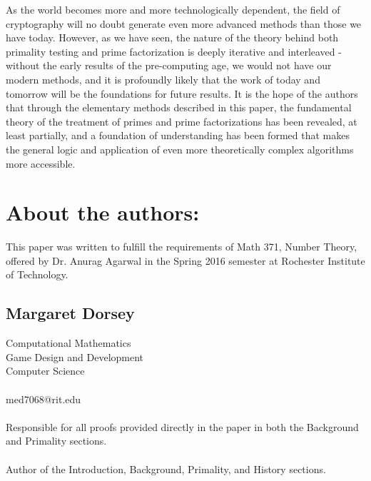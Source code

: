 \documentclass{article}
\begin{document}
\par As the world becomes more and more technologically dependent, the field of cryptography will no doubt generate even more advanced
methods than those we have today. However, as we have seen, the nature of the theory behind both primality testing and prime factorization
is deeply iterative and interleaved - without the early results of the pre-computing age, we would not have our modern methods, and it is profoundly likely that the work of today and tomorrow will be the foundations for future results. It is the hope of the authors that through the elementary methods described in this paper, the fundamental theory of the treatment of primes and prime factorizations has been revealed, at least partially, and a foundation of understanding has been formed that makes the general logic and application of even more theoretically 
complex algorithms more accessible.

\newpage

\nocite{*}
         






\section*{About the authors:}


\par This paper was written to fulfill the requirements of Math 371, Number Theory, offered by Dr. Anurag Agarwal
in the Spring 2016 semester at Rochester Institute of Technology.
\subsection*{Margaret Dorsey}
   \noindent Computational Mathematics
   \\Game Design and Development
   \\Computer Science
   \\
   \\ med7068@rit.edu
  \\
  \\ Responsible for all proofs provided directly in the paper in both the Background and Primality sections.
  \\
  \\ Author of the Introduction, Background, Primality, and History sections.
\end{document}
